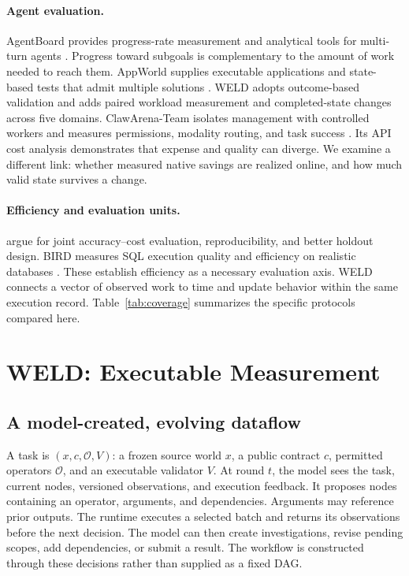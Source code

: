 \documentclass[11pt]{article}
\begin{document}
\paragraph{Agent evaluation.}
AgentBoard provides progress-rate measurement and analytical tools for multi-turn agents \citep{agentboard}. Progress toward subgoals is complementary to the amount of work needed to reach them. AppWorld supplies executable applications and state-based tests that admit multiple solutions \citep{trivedi2024appworld}. WELD adopts outcome-based validation and adds paired workload measurement and completed-state changes across five domains. ClawArena-Team isolates management with controlled workers and measures permissions, modality routing, and task success \citep{xiong2026clawarenateam}. Its API cost analysis demonstrates that expense and quality can diverge. We examine a different link: whether measured native savings are realized online, and how much valid state survives a change.

\paragraph{Efficiency and evaluation units.}
\citet{agentsmatter} argue for joint accuracy--cost evaluation, reproducibility, and better holdout design. BIRD measures SQL execution quality and efficiency on realistic databases \citep{bird}. These establish efficiency as a necessary evaluation axis. WELD connects a vector of observed work to time and update behavior within the same execution record. Table~\ref{tab:coverage} summarizes the specific protocols compared here.


\section{WELD: Executable Measurement}
\subsection{A model-created, evolving dataflow}
A task is $(x,c,\mathcal{O},V)$: a frozen source world $x$, a public contract $c$, permitted operators $\mathcal{O}$, and an executable validator $V$. At round $t$, the model sees the task, current nodes, versioned observations, and execution feedback. It proposes nodes containing an operator, arguments, and dependencies. Arguments may reference prior outputs. The runtime executes a selected batch and returns its observations before the next decision. The model can then create investigations, revise pending scopes, add dependencies, or submit a result. The workflow is constructed through these decisions rather than supplied as a fixed DAG.
\end{document}
